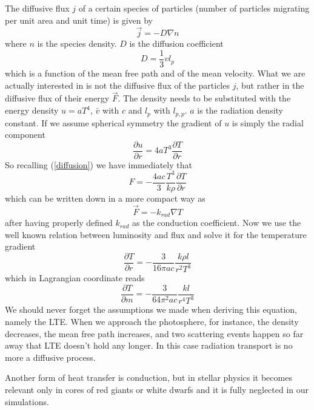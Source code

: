 The diffusive flux $j$ of a certain species of particles (number of particles migrating per unit area and unit time) is given by
\begin{equation}\label{diffusion}
	\vec  j=-D \nabla n
\end{equation}
where $n$ is the species density. $D$ is the diffusion coefficient
\begin{equation}
	D =\frac{1}{3} v l_{p}
\end{equation}
which is a function of the mean free path and of the mean velocity. What we are actually interested in is not the diffusive flux of the particles $j$, but rather in the diffusive flux of their energy $\vec F$. The density needs to be substituted with the energy density $u=aT^4$, $\bar v$ with $c$ and $l_p$ with $l_{p,p}$. $a$ is the radiation density constant. If we assume spherical symmetry the gradient of $u$ is simply the radial component
\begin{equation}
	\frac{\partial u}{\partial r} = 4  a  T^3   \frac{\partial T}{\partial r}
\end{equation}
So recalling (\ref{diffusion}) we have immediately that
\begin{equation}
	F=-\frac{4ac}{3}\frac{T^3}{k \rho} \frac{\partial T}{\partial r}
\end{equation}
which can be written down in a more compact way as 
\begin{equation}
	\vec F = - k_{rad} \nabla T
\end{equation}
after having properly defined $k_{rad}$ as the conduction coefficient. Now we use the well known relation between luminosity and flux and solve it for the temperature gradient
\begin{equation}
	\frac{\partial T}{\partial r}= - \frac{3}{16 \pi a c}\frac{k \rho l}{r^2 T^3}
\end{equation}
which in Lagrangian coordinate reads
\begin{equation}\label{partialTpartialm}
	\frac{\partial T}{\partial m}= - \frac{3}{64 \pi^2 a c}\frac{k l}{r^4 T^3}
\end{equation}
We should never forget the assumptions we made when deriving this equation, namely the LTE. When we approach the photosphere, for instance, the density decreases, the mean free path increases, and two scattering events happen so far away that LTE doesn't hold any longer. In this case radiation transport is no more a diffusive process. 

Another form of heat transfer is conduction, but in stellar physics it becomes relevant only in cores of red giants or white dwarfs and it is fully neglected in our simulations.

